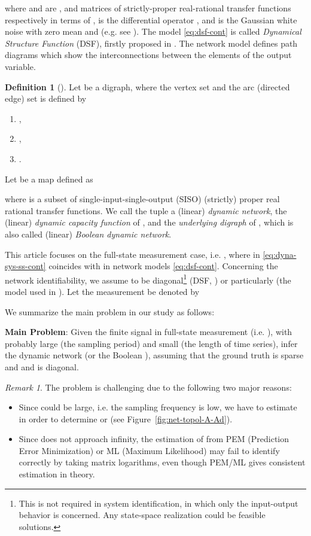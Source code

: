 \documentclass[letterpaper,10pt,journal,final]{IEEEtran}
\theoremstyle{definition}
\newtheorem{definition}[theorem]{Definition}
\theoremstyle{remark}
\newtheorem{remark}{Remark}
\begin{document}
where  and  are ,  and  matrices of
strictly-proper real-rational transfer functions respectively in terms of ,  is
the differential operator , and  is the
Gaussian white noise with zero mean and 
(e.g. see \cite{Hayden2016a}). The model \eqref{eq:dsf-cont} is called
\emph{Dynamical Structure Function} (DSF), firstly proposed in \cite{Goncalves2008}.
The network model defines path diagrams which show the interconnections between the
elements of the output variable.
\begin{definition}[\cite{Yue2017a}]
  \label{def:LTI-dynamic-network}
  Let  be a digraph,
  where the vertex set 
and the arc (directed edge) set  is defined by
  \begin{enumerate}[label=\roman*),itemindent=8pt]
  \item ,
  \item ,
  \item .
  \end{enumerate}
  Let  be a map defined as
  
  where  is a subset of single-input-single-output (SISO) (strictly) proper real rational transfer functions.
  We call the tuple  a (linear) \emph{dynamic network},   the (linear) \emph{dynamic capacity function} of , and  the \emph{underlying digraph} of , which is also called (linear) \emph{Boolean dynamic network}.
\end{definition}

This article focuses on the full-state measurement case, i.e. , where  in
\eqref{eq:dyna-sys-ss-cont} coincides with  in network models
\eqref{eq:dsf-cont}.
Concerning the network identifiability\cite{Goncalves2008}, we assume  to be
diagonal\footnote{This is not required in system identification, in which only the
  input-output behavior is concerned. Any state-space realization could be feasible
  solutions.} (DSF, \cite{Goncalves2008}) or particularly  (the model used in
\cite{VandenHof2013}).  Let the measurement be denoted by

We summarize the main problem in our study as follows:

\smallskip
\noindent\textbf{Main Problem}:
Given the finite signal  in full-state measurement (i.e. ), with probably
large  (the sampling period) and small  (the length of time series), infer the
dynamic network  (or the Boolean ), assuming that the
ground truth  is sparse and and  is diagonal.
\medskip

\begin{remark}
  \label{rmk:prob-hard-two-reasons}
  The problem is challenging due to the following two major reasons:
  \begin{itemize}
  \item Since  could be large, i.e. the sampling frequency is low, we have to
    estimate  in order to determine  or  (see
    Figure~\ref{fig:net-topol-A-Ad}).
  \item Since  does not approach infinity, the estimation of  from PEM
    (Prediction Error Minimization) or ML (Maximum Likelihood) may fail to
    identify  correctly by taking matrix logarithms, even though
    PEM/ML gives consistent estimation in theory.
\end{itemize}
\end{remark}
\end{document}
